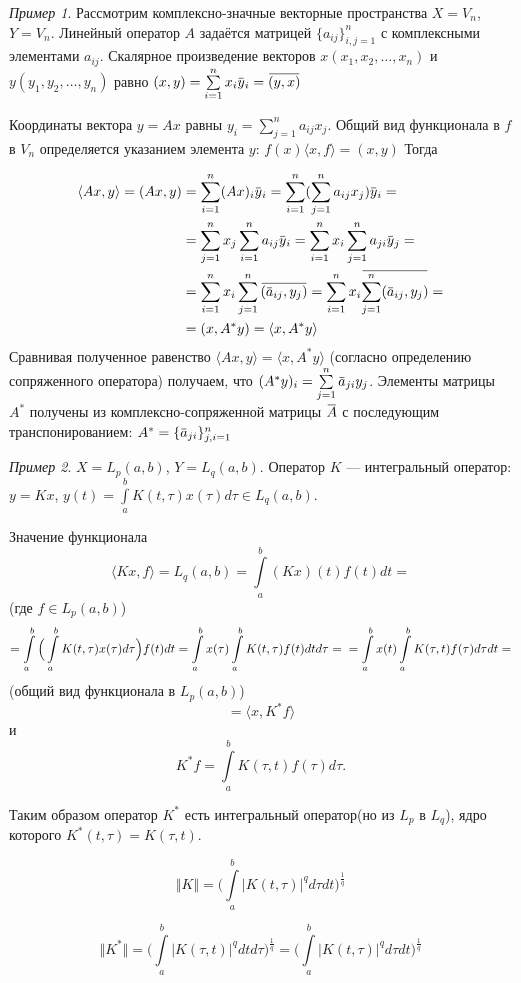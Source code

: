 \documentclass[12pt,a4paper,titlepage,oneside]{book}
\newcommand{\overbar}[1]{\mkern 1.5mu\overline{\mkern-1.5mu#1\mkern-1.5mu}\mkern 1.5mu}
\theoremstyle{definition}
\theoremstyle{plain}
\theoremstyle{break}
\theoremstyle{remark}
\theoremstyle{remark}
\newtheorem*{example}{Пример}
\theoremstyle{remark}
\theoremstyle{remark}
\theoremstyle{plain}
\theoremstyle{plain}
\begin{document}
\begin{example}
Рассмотрим комплексно-значные векторные пространства $X=V_n$, $Y=V_n$. Линейный оператор $A$ задаётся матрицей $\lbrace a_{ij} \rbrace_{i,j=1}^n$ с комплексными элементами $a_{ij}$. Скалярное произведение векторов $x(x_1,x_2,\ldots,x_n)$ и $y(y_1,y_2,\ldots,y_n)$ равно $(x,y) = \sum\limits_{i=1}^n x_i \overbar{y}_i = \overbar{(y,x)}$

Координаты вектора $y=Ax$ равны $y_i = \sum\limits_{j=1}^n a_{ij} x_j$. Общий вид функционала в $f$ в $V_n$ определяется указанием элемента $y$:
$f(x) \langle x,f \rangle = (x,y)$
Тогда

\begin{align*}
\langle Ax,y \rangle = (Ax,y) &= \sum\limits_{i=1}^n (Ax)_i \overbar{y}_i = \sum\limits_{i=1}^n (\sum\limits_{j=1}^n a_{ij}x_j)\overbar{y}_i =\\
&= \sum\limits_{j=1}^n x_j \sum\limits_{i=1}^n a_{ij}\overbar{y}_i = \sum\limits_{i=1}^n x_i \sum\limits_{j=1}^n a_{ji}\overbar{y}_j =\\
&= \sum\limits_{i=1}^n x_i \sum\limits_{j=1}^n \overbar{(\overbar{a}_{ij},y_j)} = \sum\limits_{i=1}^n x_i \overbar{\sum\limits_{j=1}^n(\overbar{a}_{ij} ,y_j)} =\\
&= (x,A^{*}y)=\langle x, A^{*}y \rangle
\end{align*} 
Сравнивая полученное равенство $\langle Ax,y \rangle = \langle x, A^{*}y \rangle$ (согласно определению сопряженного оператора) получаем, что
$(A^{*}y)_i = \sum\limits_{j=1}^n \overbar{a}_{ji} y_j$.
Элементы матрицы $A^{*}$ получены из комплексно-сопряженной матрицы $\overbar{A}$ с последующим транспонированием: $A^{*}=\{\overbar{a}_{ji}\}_{j,i=1}^n$
\end{example}

\begin{example}
$X=L_p(a,b)$, $Y=L_q(a,b)$. Оператор $K$ --- интегральный оператор: $y=Kx$, $y(t)=\int\limits_a^b K(t,\tau)x(\tau)d\tau \in L_q(a,b)$.

Значение функционала
$$\langle Kx,f \rangle = L_q(a,b)=\int\limits_a^b (Kx)(t)f(t)dt=$$ 
(где $f \in L_p(a,b)$)
$$= \int\limits_a^b \Big( \int\limits_a^b K(t,\tau)x(\tau)d\tau \Big) f(t)dt = \int\limits_a^b x(\tau) \int\limits_a^b K(t,\tau)f(t)dt d\tau =\\= \int\limits_a^b x(t) \int\limits_a^b K(\tau,t)f(\tau)d\tau dt =$$
(общий вид функционала в $L_p(a,b)$)
$$= \langle x,K^{*}f \rangle$$
и
$$K^{*}f=\int\limits_a^b K(\tau, t)f(\tau)d\tau.$$

Таким образом оператор $K^{*}$ есть интегральный оператор(но из $L_p$ в $L_q$), ядро которого $K^{*}(t,\tau)=K(\tau,t)$.

$$\Vert K \Vert = \Big( \displaystyle\int\limits_a^b \lvert K(t,\tau) \rvert^q d\tau dt  \Big)^{\frac{1}{q}}$$

$$\Vert K^{*} \Vert =  \Big( \displaystyle\int\limits_a^b \lvert K(\tau, t) \rvert^q dt d\tau  \Big)^{\frac{1}{q}} =  \Big( \displaystyle\int\limits_a^b \lvert K(t,\tau) \rvert^q d\tau dt  \Big)^{\frac{1}{q}}$$
\end{example}
\end{document}
